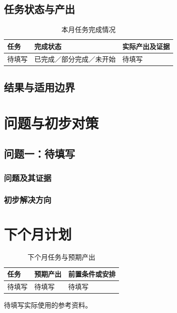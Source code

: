 \documentclass[stage1]{ydzjreport}
\begin{document}
\subsection{任务状态与产出}
\begin{table}[H]\centering
\caption{本月任务完成情况}
\begin{tabularx}{\textwidth}{@{}Y Y Y@{}}
\toprule
{} 任务 & 完成状态 & 实际产出及证据 \\
\midrule
待填写 & 已完成／部分完成／未开始 & 待填写 \\
\bottomrule
\end{tabularx}
\end{table}
\subsection{结果与适用边界}

\section{问题与初步对策}
\subsection{问题一：待填写}
\subsubsection{问题及其证据}
\subsubsection{初步解决方向}

\section{下个月计划}
\begin{table}[H]\centering
\caption{下个月任务与预期产出}
\begin{tabularx}{\textwidth}{@{}Y Y Y@{}}
\toprule
{} 任务 & 预期产出 & 前置条件或安排 \\
\midrule
待填写 & 待填写 & 待填写 \\
\bottomrule
\end{tabularx}
\end{table}

\begin{thebibliography}{9}
 待填写实际使用的参考资料。
\end{thebibliography}
\end{document}
